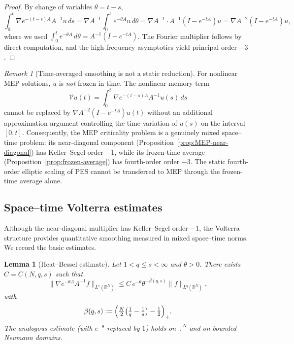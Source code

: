 \documentclass[11pt,reqno]{amsart}
\newtheorem{lemma}[theorem]{Lemma}
\theoremstyle{definition}
\theoremstyle{remark}
\newtheorem{remark}[theorem]{Remark}
\newcommand{\R}{\mathbb{R}}
\newcommand{\T}{\mathbb{T}}
\newcommand{\Vop}{\mathcal{V}}
\begin{document}
\begin{proof}
By change of variables $\theta=t-s$,
\[
        \int_0^t \nabla e^{-(t-s)A}A^{-1}u\,ds
        =\nabla A^{-1}\int_0^t e^{-\theta A}u\,d\theta
        =\nabla A^{-1}\cdot A^{-1}(I-e^{-tA})u
        =\nabla A^{-2}(I-e^{-tA})u,
\]
where we used $\int_0^t e^{-\theta A}\,d\theta=A^{-1}(I-e^{-tA})$. The Fourier multiplier follows by direct computation, and the high-frequency asymptotics yield principal order $-3$.
\end{proof}

\begin{remark}[Time-averaged smoothing is not a static reduction]\label{rem:not-static-reduction}
For nonlinear MEP solutions, $u$ is \emph{not} frozen in time. The nonlinear memory term
\[
        \Vop u(t)=\int_0^t \nabla e^{-(t-s)A}A^{-1}u(s)\,ds
\]
cannot be replaced by $\nabla A^{-2}(I-e^{-tA})u(t)$ without an additional approximation argument controlling the time variation of $u(s)$ on the interval $[0,t]$. Consequently, the MEP criticality problem is a genuinely mixed space--time problem: its near-diagonal component (Proposition~\ref{prop:MEP-near-diagonal}) has Keller--Segel order $-1$, while its frozen-time average (Proposition~\ref{prop:frozen-average}) has fourth-order order $-3$. The static fourth-order elliptic scaling of PES cannot be transferred to MEP through the frozen-time average alone.
\end{remark}

\subsection{Space--time Volterra estimates}
\label{subsec:Volterra-estimates}

Although the near-diagonal multiplier has Keller--Segel order $-1$, the Volterra structure provides quantitative smoothing measured in mixed space--time norms. We record the basic estimates.

\begin{lemma}[Heat--Bessel estimate]\label{lem:heat-Bessel}
Let $1<q\le s<\infty$ and $\theta>0$. There exists $C=C(N,q,s)$ such that
\begin{equation}\label{eq:heat-Bessel}
        \|\nabla e^{-\theta A}A^{-1}f\|_{L^{s}(\R^{N})}
        \le C\,e^{-\theta}\theta^{-\beta(q,s)}\|f\|_{L^{q}(\R^{N})},
\end{equation}
with
\begin{equation}\label{eq:beta-qs}
        \beta(q,s):=\Bigl(\tfrac{N}{2}\bigl(\tfrac{1}{q}-\tfrac{1}{s}\bigr)-\tfrac{1}{2}\Bigr)_{+}.
\end{equation}
The analogous estimate (with $e^{-\theta}$ replaced by $1$) holds on $\T^{N}$ and on bounded Neumann domains.
\end{lemma}
\end{document}
